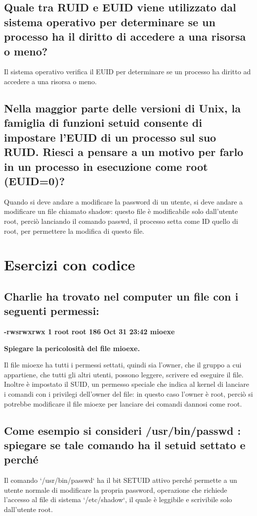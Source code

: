 \documentclass{report}
\begin{document}
\subsection{Quale tra RUID e EUID viene utilizzato dal sistema operativo per determinare se un processo
ha il diritto di accedere a una risorsa o meno?}
Il sistema operativo verifica il EUID per determinare se un processo ha diritto ad accedere a una risorsa o meno.
\subsection{Nella maggior parte delle versioni di Unix, la famiglia di funzioni setuid consente di impostare l'EUID di un processo sul suo RUID. Riesci a pensare a un motivo per farlo in un processo in esecuzione come root (EUID=0)?}
Quando si deve andare a modificare la password di un utente, si deve andare a modificare un file chiamato shadow: questo file è modificabile solo dall'utente root, perciò lanciando il comando passwd, il processo setta come ID quello di root, per permettere la modifica di questo file.




\section{Esercizi con codice}


\subsection{Charlie ha trovato nel computer un file con i seguenti permessi:}
\noindent \textbf{-rwsrwxrwx 1 root root 186 Oct 31 23:42 mioexe}

\noindent \textbf{Spiegare la pericolosità del file mioexe.}

\noindent Il file mioexe ha tutti i permessi settati, quindi sia l'owner, che il gruppo a cui appartiene, che tutti gli altri utenti, possono leggere, scrivere ed eseguire il file.
Inoltre è impostato il SUID, un permesso speciale che indica al kernel di lanciare i comandi con i privilegi dell'owner del file: in questo caso l'owner è root, 
perciò si potrebbe modificare il file mioexe per lanciare dei comandi dannosi come root.

\subsection{Come esempio si consideri /usr/bin/passwd : spiegare se tale comando ha il setuid settato e
perché}
Il comando `/usr/bin/passwd` ha il bit SETUID attivo perché permette a un utente normale di modificare la propria password, operazione che richiede l'accesso al file di sistema `/etc/shadow`, il quale è leggibile e scrivibile solo dall'utente root.
\end{document}
